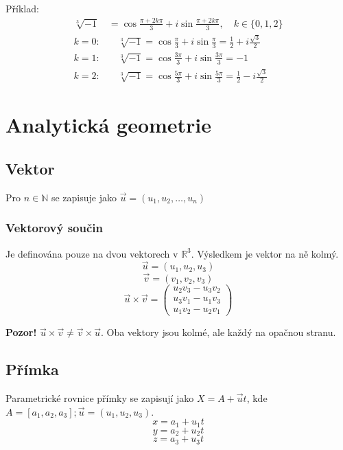 \documentclass[12pt, a4paper]{scrartcl}
\begin{document}
    Příklad:
    \begin{align*}
        \sqrt[3]{-1} &= \cos \frac{\pi + 2k \pi}{3} + i \sin \frac{\pi + 2k \pi}{3}, \quad k \in \{0,1,2\} \\
        k = 0: &\quad \sqrt[3]{-1} = \cos \frac{\pi}{3} + i \sin \frac{\pi}{3} = \frac{1}{2} + i \frac{\sqrt{3}}{2} \\ 
        k = 1: &\quad \sqrt[3]{-1} = \cos \frac{3\pi}{3} + i \sin \frac{3\pi}{3} = -1 \\ 
        k = 2: &\quad \sqrt[3]{-1} = \cos \frac{5\pi}{3} + i \sin \frac{5\pi}{3} = \frac{1}{2} - i \frac{\sqrt{3}}{2} 
    \end{align*}
    \section{Analytická geometrie}
    \subsection{Vektor}
    Pro $n \in \mathds{N}$ se zapisuje jako $\vec{u} = (u_1, u_2, \dots, u_n)$
    
    \subsubsection{Vektorový součin}
    Je definována pouze na dvou vektorech v $\mathds{R}^3$. 
    Výsledkem je vektor na ně kolmý.
    \[\vec{u} = (u_1, u_2, u_3)\]
    \[\vec{v} = (v_1, v_2, v_3)\]
    \begin{equation*}
        \vec{u}\times \vec{v} = 
        \begin{pmatrix}
            u_2 v_3 - u_3 v_2 \\
            u_3 v_1 - u_1 v_3 \\
            u_1 v_2 - u_2 v_1
        \end{pmatrix}
    \end{equation*}

    \textbf{Pozor!} $\vec{u}\times \vec{v} \neq \vec{v}\times \vec{u}$.
    Oba vektory jsou kolmé, ale každý na opačnou stranu.

    \subsection{Přímka}
    Parametrické rovnice přímky se zapisují jako $X = A + \vec{u} t$, 
    kde $A = [a_1, a_2, a_3]; \vec{u} = (u_1, u_2, u_3)$.
    \[x = a_1 + u_1 t\]
    \[y = a_2 + u_2 t\]
    \[z = a_3 + u_3 t\]
\end{document}
